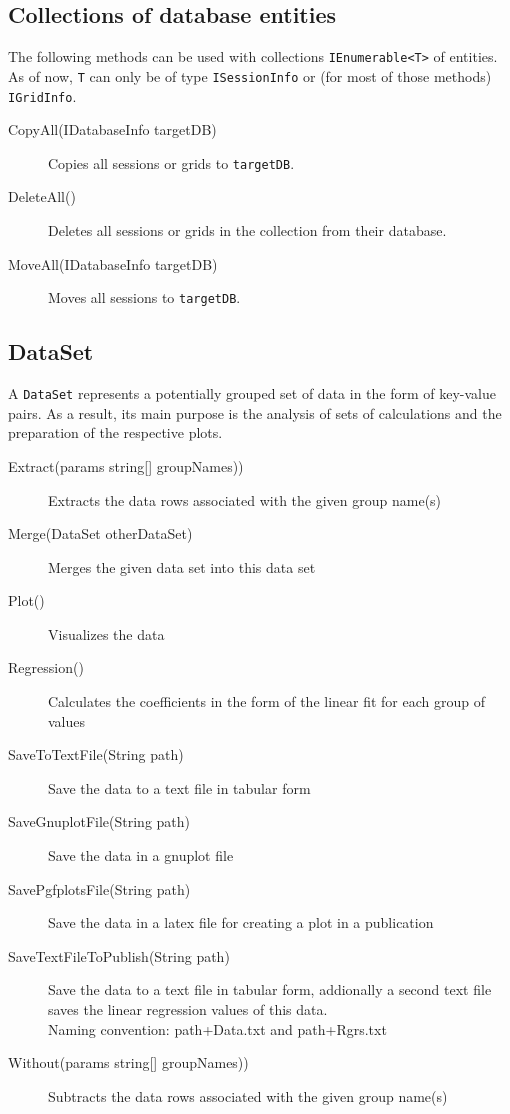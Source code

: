 \subsection{Collections of database entities}
The following methods can be used with collections \lstinline{IEnumerable<T>} of entities. As of now, \lstinline{T} can only be of type \lstinline{ISessionInfo} or (for most of those methods) \lstinline{IGridInfo}.
\begin{description}
	\item[CopyAll(IDatabaseInfo targetDB)]
	Copies all sessions or grids to \lstinline{targetDB}.
	
	\item[DeleteAll()]
	Deletes all sessions or grids in the collection from their database.
	
	\item[MoveAll(IDatabaseInfo targetDB)]
	Moves all sessions to \lstinline{targetDB}.
\end{description}

\subsection{DataSet}
\label{sec:DataSet}

A \lstinline{DataSet} represents a potentially grouped set of data in the form of key-value pairs. As a result, its main purpose is the analysis of sets of calculations and the preparation of the respective plots.
\begin{description}
	\item[Extract(params string{[}{]} groupNames))]
	Extracts the data rows associated with the given group name(s)
	
	\item[Merge(DataSet otherDataSet)]
	Merges the given data set into this data set
	
	\item[Plot()]
	Visualizes the data
	
	\item[Regression()]
	Calculates the coefficients in the form of the linear fit for each group of values
	
	\item[SaveToTextFile(String path)]
	Save the data to a text file in tabular form
	
	\item[SaveGnuplotFile(String path)]
	Save the data in a gnuplot file
	
	\item[SavePgfplotsFile(String path)]
	Save the data in a latex file for creating a plot in a publication
	
	\item[SaveTextFileToPublish(String path)]
	Save the data to a text file in tabular form, addionally a second text file saves the linear regression values of this data.\\ Naming convention: path+Data.txt and path+Rgrs.txt
	
	\item[Without(params string{[}{]} groupNames))]
	Subtracts the data rows associated with the given group name(s)
\end{description}


